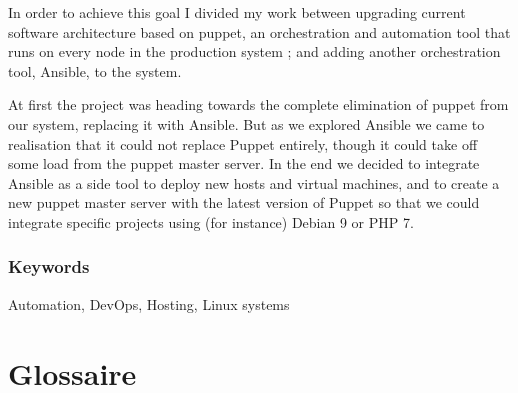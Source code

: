 \documentclass[14 pt,a4paper]{extreport}
\begin{document}
In order to achieve this goal I divided my work between upgrading current software architecture based on puppet, an orchestration and automation tool that runs on every node in the production system ; and adding another orchestration tool, Ansible, to the system.

At first the project was heading towards the complete elimination of puppet from our system, replacing it with Ansible. But as we explored Ansible we came to realisation that it could not replace Puppet entirely, though it could take off some load from the puppet master server. In the end we decided to integrate Ansible as a side tool to deploy new hosts and virtual machines, and to create a new puppet master server with the latest version of Puppet so that we could integrate specific projects using (for instance) Debian 9 or PHP 7.
\subsection*{Keywords}
Automation, DevOps, Hosting, Linux systems


\chapter*{Glossaire}
\end{document}
